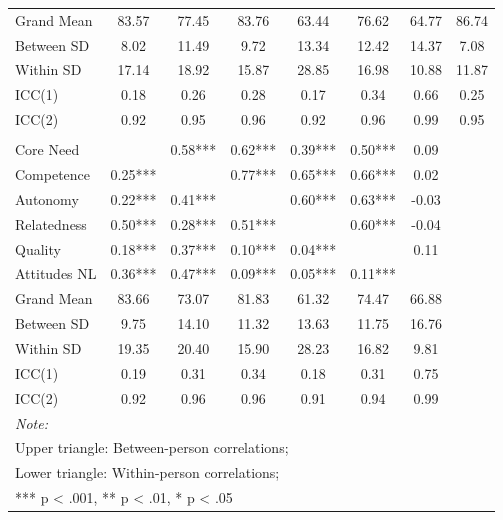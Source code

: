 \begin{table}
\begin{minipage}[t][\textheight][t]{\textwidth}
{\begin{tabular}[t]{lccccccc}
\addlinespace
\hspace{1em}Grand Mean & 83.57 & 77.45 & 83.76 & 63.44 & 76.62 & 64.77 & 86.74\\
\hspace{1em}Between SD & 8.02 & 11.49 & 9.72 & 13.34 & 12.42 & 14.37 & 7.08\\
\hspace{1em}Within SD & 17.14 & 18.92 & 15.87 & 28.85 & 16.98 & 10.88 & 11.87\\
\hspace{1em}ICC(1) & 0.18 & 0.26 & 0.28 & 0.17 & 0.34 & 0.66 & 0.25\\
\hspace{1em}ICC(2) & 0.92 & 0.95 & 0.96 & 0.92 & 0.96 & 0.99 & 0.95\\
\addlinespace[0.3em]
\multicolumn{8}{l}{\textbf{Across Studies}}\\
\hspace{1em}Core Need &  & 0.58*** & 0.62*** & 0.39*** & 0.50*** & 0.09 & \\
\hspace{1em}Competence & 0.25*** &  & 0.77*** & 0.65*** & 0.66*** & 0.02 & \\
\hspace{1em}Autonomy & 0.22*** & 0.41*** &  & 0.60*** & 0.63*** & -0.03 & \\
\hspace{1em}Relatedness & 0.50*** & 0.28*** & 0.51*** &  & 0.60*** & -0.04 & \\
\hspace{1em}Quality & 0.18*** & 0.37*** & 0.10*** & 0.04*** &  & 0.11 & \\
\hspace{1em}Attitudes NL & 0.36*** & 0.47*** & 0.09*** & 0.05*** & 0.11*** &  & \\
\addlinespace
\hspace{1em}Grand Mean & 83.66 & 73.07 & 81.83 & 61.32 & 74.47 & 66.88 & \\
\hspace{1em}Between SD & 9.75 & 14.10 & 11.32 & 13.63 & 11.75 & 16.76 & \\
\hspace{1em}Within SD & 19.35 & 20.40 & 15.90 & 28.23 & 16.82 & 9.81 & \\
\hspace{1em}ICC(1) & 0.19 & 0.31 & 0.34 & 0.18 & 0.31 & 0.75 & \\
\hspace{1em}ICC(2) & 0.92 & 0.96 & 0.96 & 0.91 & 0.94 & 0.99 & \\
\bottomrule
\multicolumn{8}{l}{\rule{0pt}{1em}\textit{Note: }}\\
\multicolumn{8}{l}{\rule{0pt}{1em}Upper triangle: Between-person correlations;}\\
\multicolumn{8}{l}{\rule{0pt}{1em}Lower triangle: Within-person correlations;}\\
\multicolumn{8}{l}{\rule{0pt}{1em}*** p < .001, ** p < .01,  * p < .05}\\
\end{tabular}}
\end{minipage}
\end{table}

